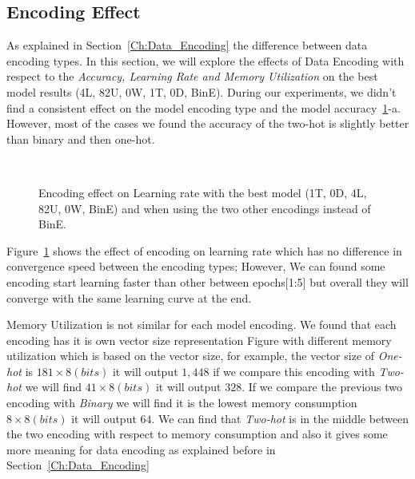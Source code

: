 \subsection{Encoding Effect}

As explained in Section~\ref{Ch:Data_Encoding} the difference between data encoding types. In this section, we will explore the effects of Data Encoding with respect to the \textit{Accuracy, Learning Rate and Memory Utilization} on the best model results (4L, 82U, 0W, 1T, 0D, BinE). During our experiments, we didn't find a consistent effect on the model encoding type and the model accuracy~\ref{Fig:Convergence_Memory}-a. However, most of the cases we found the accuracy of the two-hot is slightly better than binary and then one-hot.


\begin{figure}[!t]
  \centering
  \begin{tikzpicture}
    
  \end{tikzpicture}
  \caption{Encoding effect on Learning rate with the best model (1T, 0D, 4L, 82U, 0W, BinE) and when using the two other encodings instead of BinE.}~\label{Fig:Convergence_Memory}%
\end{figure}


Figure~\ref{Fig:Convergence_Memory} shows the effect of encoding on learning rate which has no difference in convergence speed between the encoding types; However, We can found some encoding start learning faster than other between epochs[1:5] but overall they will converge with the same learning curve at the end.


Memory Utilization is not similar for each model encoding. We found that each encoding has it is own vector size representation Figure with different memory utilization which is based on the vector size, for example, the vector size of \textit{One-hot} is $181 \times 8(bits)$ it will output $1,448$ if we compare this encoding with \textit{Two-hot} we will find $41 \times 8(bits)$ it will output $328$. If we compare the previous two encoding with \textit{Binary} we will find it is the lowest memory consumption $8 \times 8(bits)$ it will output $64$. We can find that \textit{Two-hot} is in the middle between the two encoding with respect to memory consumption and also it gives some more meaning for data encoding as explained before in Section~\ref{Ch:Data_Encoding}

